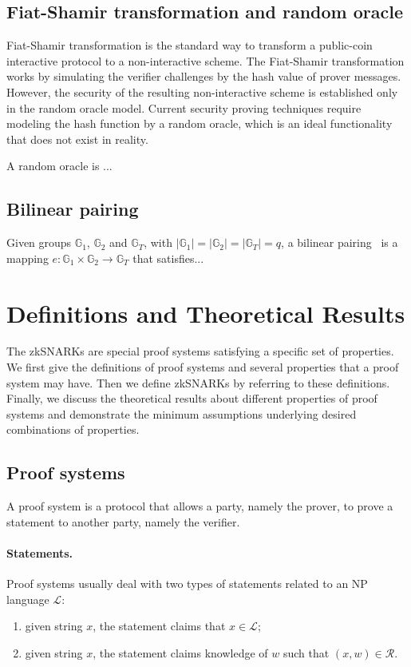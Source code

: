 \documentclass[acmtog]{acmart}
\newcommand{\bbG}{\mathbb{G}}
\newcommand{\cL}{\mathcal{L}}
\newcommand{\cR}{\mathcal{R}}
\begin{document}
\subsection{Fiat-Shamir transformation and random oracle}

Fiat-Shamir transformation is the standard way to transform a public-coin interactive protocol to a non-interactive scheme.
The Fiat-Shamir transformation works by simulating the verifier challenges by the hash value of prover messages.
However, the security of the resulting non-interactive scheme is established only in the random oracle model.
Current security proving techniques require modeling the hash function by a random oracle, which is an ideal functionality that does not exist in reality.

A random oracle is ...

\subsection{Bilinear pairing}

Given groups $\bbG_1$, $\bbG_2$ and $\bbG_T$, with $|\bbG_1|=|\bbG_2|=|\bbG_T|=q$, a bilinear pairing~\cite{BonehF01} is a mapping $e:\bbG_1\times\bbG_2\to\bbG_T$ that satisfies...

\section{Definitions and Theoretical Results}

The zkSNARKs are special proof systems satisfying a specific set of properties.
We first give the definitions of proof systems and several properties that a proof system may have.
Then we define zkSNARKs by referring to these definitions.
Finally, we discuss the theoretical results about different properties of proof systems and demonstrate the minimum assumptions underlying desired combinations of properties.

\subsection{Proof systems}

A proof system is a protocol that allows a party, namely the prover, to prove a statement to another party, namely the verifier.

\paragraph{Statements.} Proof systems usually deal with two types of statements related to an NP language $\cL$:
\begin{enumerate}
	\item given string $x$, the statement claims that $x\in\cL$;
	\item given string $x$, the statement claims knowledge of $w$ such that $(x,w)\in\cR$.
\end{enumerate}
\end{document}
